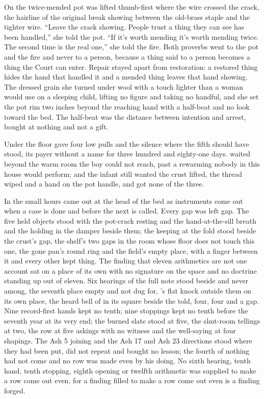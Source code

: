 On  the twice-mended pot was lifted thumb-first where the wire crossed the crack, the hairline of the original break showing between the old-brass staple and the tighter wire. “Leave the crack showing. People trust a thing they can see has been handled,” she told the pot. “If it's worth mending it's worth mending twice. The second time is the real one,” she told the fire. Both proverbs went to the pot and the fire and never to a person, because a thing said to a person becomes a thing the Court can enter. Repair stayed apart from restoration: a restored thing hides the hand that handled it and a mended thing leaves that hand showing. The dressed grain she turned under wool with a touch lighter than a woman would use on a sleeping child, lifting no figure and taking no handful, and she set the pot rim two inches beyond the reaching hand with a half-beat and no look toward the bed. The half-beat was the distance between intention and arrest, bought at nothing and not a gift.

Under the floor  gave four low pulls and the silence where the fifth should have stood, its payer without a name for three hundred and eighty-one days.  waited beyond the warm room the boy could not reach, past a rewarming nobody in this house would perform; and the infant still wanted the crust lifted, the thread wiped and a hand on the pot handle, and got none of the three.

\scenebreak

In the small hours  came out at the head of the bed as instruments come out when a case is done and before the next is called. Every gap was left gap. The five held objects stood with the pot-crack resting and the hand-at-the-sill breath and the holding in the damper beside them; the keeping at the fold stood beside the crust's gap, the shelf's two gaps in the room whose floor does not touch this one, the gone pan's round ring and the field's empty place, with a finger between it and every other kept thing. The finding that eleven arithmetics are not one account sat on a place of its own with no signature on the space and no doctrine standing up out of eleven. Six hearings of the full note stood beside and never among, the seventh place empty and not dug for, 's flat knock outside them on its own place, the heard bell of  in its square beside the told, four, four and a gap. Nine record-first hands kept no tenth; nine stoppings kept no tenth before the seventh year at its very end; the burned slate stood at five, the shut-room tellings at two, the row at five askings with no witness and the well-saying at four shapings. The Ash 5 joining and the Ash 17 and Ash 23 directions stood where they had been put, did not repeat and bought no lesson; the fourth of nothing had not come and no row was made even by his doing. No sixth hearing, tenth hand, tenth stopping, eighth opening or twelfth arithmetic was supplied to make a row come out even, for a finding filled to make a row come out even is a finding forged.

